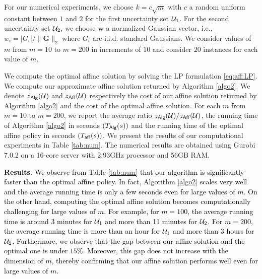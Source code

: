 \documentclass[moor]{informs1}              %
\newcommand{\mb}[1]{\ensuremath{\boldsymbol{#1}}}
\newcommand*{\red}{\textcolor{black}}
\begin{document}
For our numerical experiments, we choose $k=c  \sqrt{m}$  with $c$  a random uniform constant between $1$ and $2$ for the first uncertainty set ${\cal U}_1$. For the second uncertainty set ${\cal U}_2$, we choose $\mb w$ a normalized Gaussian vector, i.e., $ w_i = \vert G_i \vert / \|  {\mb G} \|_2 $ where $G_i$ are i.i.d. standard Gaussians. We consider values of $m$ from $m=10$ to $ m=200$ in increments of $10$ and consider $20$ instances for each value of $m$. 

We compute the optimal affine solution by solving the LP formulation \eqref{eq:aff:LP}.  We compute our approximate affine solution returned by Algorithm \ref{algo2}. We denote  $z_{\sf{Alg}} ({\cal U})$ and $ z_{\sf{Aff}}({\cal U})$ respectively the cost of our affine solution returned by Algorithm \ref{algo2} and the cost of the optimal affine solution. For each $m$ from $m=10$ to $m=200$, we report the average ratio $  z_{\sf{Alg}} ({\cal U})/ z_{\sf{Aff}}({\cal U}) $, the running time of Algorithm \ref{algo2} in seconds $(T_{\sf Alg}(s))$ and the running time of the optimal affine policy in seconds $(T_{\sf aff}(s))$. We present the results of our computational experiments in Table \ref{tab:num}. The numerical results are obtained using Gurobi 7.0.2 on a 16-core server with 2.93GHz processor and 56GB RAM.

\vspace{2mm}
\noindent
{\bf Results.}
\red{ We observe from Table \ref{tab:num} that our algorithm is significantly faster than the optimal affine policy. In fact, Algorithm \ref{algo2} scales very well and the average running time is only a few seconds even for large values of $m$. On the other hand, computing the optimal affine solution becomes computationally challenging for large values of $m$.  For example,  for $m=100$, the average running time is around 3 minutes for ${\cal U}_1$ and more than 11 minutes for ${\cal U}_2$. For $m=200$, the average running time is more than an hour for ${\cal U}_1$ and more than 3 hours for ${\cal U}_2$.  Furthermore, we observe that the gap between our affine solution and the optimal one is under $15\%$. Moreover, this gap does not increase with the dimension of $m$, thereby confirming that our affine solution performs well even for large values of $m$.}
\end{document}
